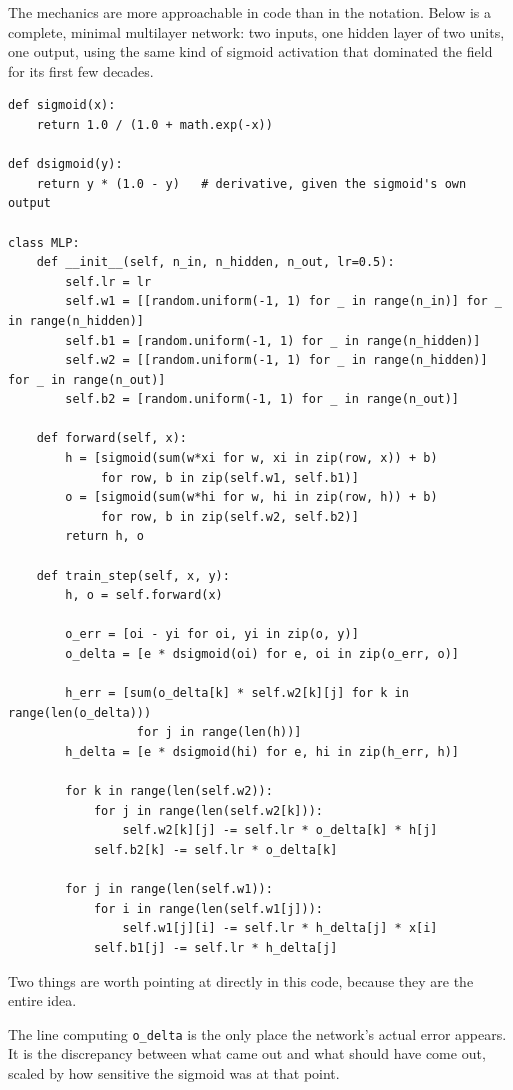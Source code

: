 The mechanics are more approachable in code than in the notation. Below is a complete, minimal multilayer network: two inputs, one hidden layer of two units, one output, using the same kind of sigmoid activation that dominated the field for its first few decades.

\begin{Verbatim}[fontsize=\small, frame=single, xleftmargin=1em, xrightmargin=1em]
def sigmoid(x):
    return 1.0 / (1.0 + math.exp(-x))

def dsigmoid(y):
    return y * (1.0 - y)   # derivative, given the sigmoid's own output

class MLP:
    def __init__(self, n_in, n_hidden, n_out, lr=0.5):
        self.lr = lr
        self.w1 = [[random.uniform(-1, 1) for _ in range(n_in)] for _ in range(n_hidden)]
        self.b1 = [random.uniform(-1, 1) for _ in range(n_hidden)]
        self.w2 = [[random.uniform(-1, 1) for _ in range(n_hidden)] for _ in range(n_out)]
        self.b2 = [random.uniform(-1, 1) for _ in range(n_out)]

    def forward(self, x):
        h = [sigmoid(sum(w*xi for w, xi in zip(row, x)) + b)
             for row, b in zip(self.w1, self.b1)]
        o = [sigmoid(sum(w*hi for w, hi in zip(row, h)) + b)
             for row, b in zip(self.w2, self.b2)]
        return h, o

    def train_step(self, x, y):
        h, o = self.forward(x)

        o_err = [oi - yi for oi, yi in zip(o, y)]
        o_delta = [e * dsigmoid(oi) for e, oi in zip(o_err, o)]

        h_err = [sum(o_delta[k] * self.w2[k][j] for k in range(len(o_delta)))
                  for j in range(len(h))]
        h_delta = [e * dsigmoid(hi) for e, hi in zip(h_err, h)]

        for k in range(len(self.w2)):
            for j in range(len(self.w2[k])):
                self.w2[k][j] -= self.lr * o_delta[k] * h[j]
            self.b2[k] -= self.lr * o_delta[k]

        for j in range(len(self.w1)):
            for i in range(len(self.w1[j])):
                self.w1[j][i] -= self.lr * h_delta[j] * x[i]
            self.b1[j] -= self.lr * h_delta[j]
\end{Verbatim}

Two things are worth pointing at directly in this code, because they are the entire idea.

The line computing \texttt{o\_delta} is the only place the network's actual error appears. It is the discrepancy between what came out and what should have come out, scaled by how sensitive the sigmoid was at that point.


